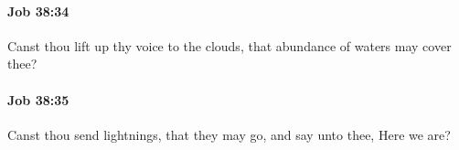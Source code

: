 		\paragraph{Job 38:34} %
			\label{JOB-38-34}

			Canst thou lift up thy voice to the clouds, that abundance of waters may cover thee?


		\paragraph{Job 38:35} %
			\label{JOB-38-35}

			Canst thou send lightnings, that they may go, and say unto thee, Here we are?



